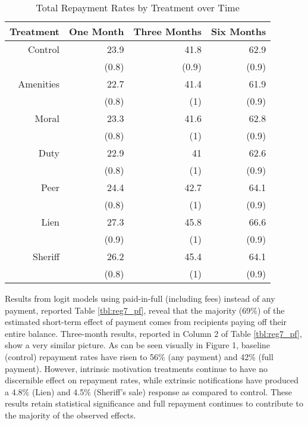 \documentclass[12pt,titlepage]{article}
\begin{document}
\begin{table}[ht]
\centering
\caption{Total Repayment Rates by Treatment over Time} 
\label{tbl:marg_pf}
\begin{tabular}{rrrr}
  \hline
Treatment & One Month & Three Months & Six Months \\ 
  \hline
Control & 23.9 & 41.8 & 62.9 \\ 
   & (0.8) & (0.9) & (0.9) \\ 
  Amenities & 22.7 & 41.4 & 61.9 \\ 
   & (0.8) & (1) & (0.9) \\ 
  Moral & 23.3 & 41.6 & 62.8 \\ 
   & (0.8) & (1) & (0.9) \\ 
  Duty & 22.9 & 41 & 62.6 \\ 
   & (0.8) & (1) & (0.9) \\ 
  Peer & 24.4 & 42.7 & 64.1 \\ 
   & (0.8) & (1) & (0.9) \\ 
  Lien & 27.3 & 45.8 & 66.6 \\ 
   & (0.9) & (1) & (0.9) \\ 
  Sheriff & 26.2 & 45.4 & 64.1 \\ 
   & (0.8) & (1) & (0.9) \\ 
   \hline
\end{tabular}
\end{table}

Results from logit models using 
paid-in-full (including fees) instead of any payment, reported Table 
\ref{tbl:reg7_pf}, reveal that the majority (69\%) of the estimated 
short-term effect of payment comes from recipients paying off their entire balance.
Three-month results, reported in Column 2 of Table \ref{tbl:reg7_pf}, show a very 
similar picture. As can be seen visually in Figure 1, baseline (control) 
repayment rates have risen to 56\% (any payment) and 42\% (full payment). 
However, intrinsic motivation treatments continue to have no discernible 
effect on repayment rates, while extrinsic notifications have produced a 
4.8\% (Lien) and 4.5\% (Sheriff's sale) response as compared to control. These 
results retain statistical significance and full repayment continues to 
contribute to the majority of the observed effects.
\end{document}

